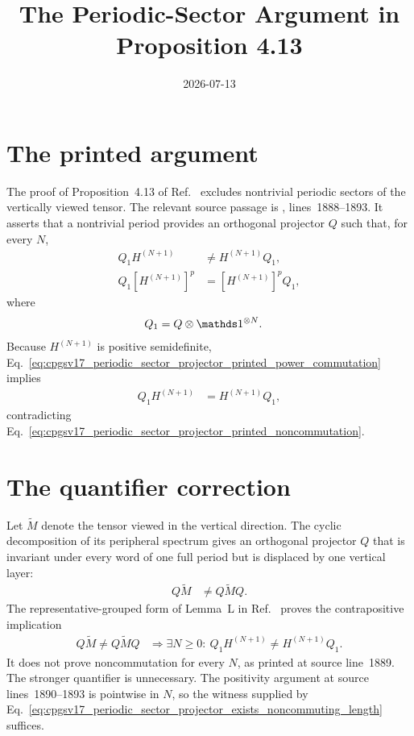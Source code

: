 \documentclass{article}
\title{The Periodic-Sector Argument in Proposition 4.13}
\author{}
\date{2026-07-13}
\begin{document}
\maketitle
{}

\section{The printed argument}

The proof of Proposition~4.13 of
Ref.~\cite[Proposition~4.13]{Cirac2016MPDO_arXiv} excludes nontrivial periodic
sectors of the vertically viewed tensor. The relevant source passage is
, lines~1888--1893. It asserts
that a nontrivial period provides an orthogonal projector $Q$ such that, for
every $N$,
\begin{align}
    Q_1H^{(N+1)}
        &\ne H^{(N+1)}Q_1,
    \label{eq:cpgsv17_periodic_sector_projector_printed_noncommutation}\\
    Q_1[H^{(N+1)}]^p
        &=[H^{(N+1)}]^pQ_1,
    \label{eq:cpgsv17_periodic_sector_projector_printed_power_commutation}
\end{align}
where
\begin{align}
    Q_1
        &=Q\otimes\Id^{\otimes N}.
    \label{eq:cpgsv17_periodic_sector_projector_first_site_projector}
\end{align}
Because $H^{(N+1)}$ is positive semidefinite,
Eq.~\ref{eq:cpgsv17_periodic_sector_projector_printed_power_commutation}
implies
\begin{align}
    Q_1H^{(N+1)}
        &=H^{(N+1)}Q_1,
    \label{eq:cpgsv17_periodic_sector_projector_power_implies_commutation}
\end{align}
contradicting
Eq.~\ref{eq:cpgsv17_periodic_sector_projector_printed_noncommutation}.

\section{The quantifier correction}

Let $\widetilde M$ denote the tensor viewed in the vertical direction. The
cyclic decomposition of its peripheral spectrum gives an orthogonal projector
$Q$ that is invariant under every word of one full period but is displaced by
one vertical layer:
\begin{align}
    Q\widetilde M
        &\ne Q\widetilde M Q.
    \label{eq:cpgsv17_periodic_sector_projector_vertical_displacement}
\end{align}
The representative-grouped form of Lemma~L in
Ref.~\cite{Cirac2016MPDO_arXiv} proves the contrapositive implication
\begin{align}
    Q\widetilde M\ne Q\widetilde M Q
        &\Longrightarrow
        \exists N\geq0:\
        Q_1H^{(N+1)}\ne H^{(N+1)}Q_1.
    \label{eq:cpgsv17_periodic_sector_projector_exists_noncommuting_length}
\end{align}
It does not prove noncommutation for every $N$, as printed at source
line~1889. The stronger quantifier is unnecessary. The positivity argument at
source lines~1890--1893 is pointwise in $N$, so the witness supplied by
Eq.~\ref{eq:cpgsv17_periodic_sector_projector_exists_noncommuting_length}
suffices.
\end{document}
